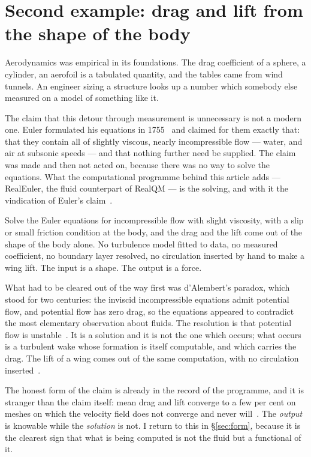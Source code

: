 \documentclass[11pt]{article}
\begin{document}
\section{Second example: drag and lift from the shape of the body}\label{sec:euler}

Aerodynamics was empirical in its foundations. The drag coefficient of a sphere, a cylinder, an
aerofoil is a tabulated quantity, and the tables came from wind tunnels. An engineer sizing a
structure looks up a number which somebody else measured on a model of something like it.

The claim that this detour through measurement is unnecessary is not a modern one. Euler
formulated his equations in 1755~\cite{euler1755} and claimed for them exactly that: that they
contain all of slightly viscous, nearly incompressible flow --- water, and air at subsonic speeds
--- and that nothing further need be supplied. The claim was made and then not acted on, because
there was no way to solve the equations. What the computational programme behind this article adds
--- RealEuler, the fluid counterpart of RealQM --- is the solving, and with it the vindication of
Euler's claim~\cite{cfd,dalembert,flight}.

Solve the Euler equations for incompressible flow with slight viscosity, with a slip or small
friction condition at the body, and the drag and the lift come out of the shape of the body alone.
No turbulence model fitted to data, no measured coefficient, no boundary layer resolved, no
circulation inserted by hand to make a wing lift. The input is a shape. The output is a force.

What had to be cleared out of the way first was d'Alembert's paradox, which stood for two centuries:
the inviscid incompressible equations admit potential flow, and potential flow has zero drag, so the
equations appeared to contradict the most elementary observation about fluids. The resolution is that
potential flow is unstable~\cite{dalembert}. It is a solution and it is not the one which occurs;
what occurs is a turbulent wake whose formation is itself computable, and which carries the drag.
The lift of a wing comes out of the same computation, with no circulation
inserted~\cite{flight}.

The honest form of the claim is already in the record of the programme, and it is stranger than the
claim itself: mean drag and lift converge to a few per cent on meshes on which the velocity field
does not converge and never will~\cite{drag,parameterfree,clay}. The \emph{output} is knowable while the \emph{solution} is not. I
return to this in \S\ref{sec:form}, because it is the clearest sign that what is being computed is
not the fluid but a functional of it.
\end{document}
